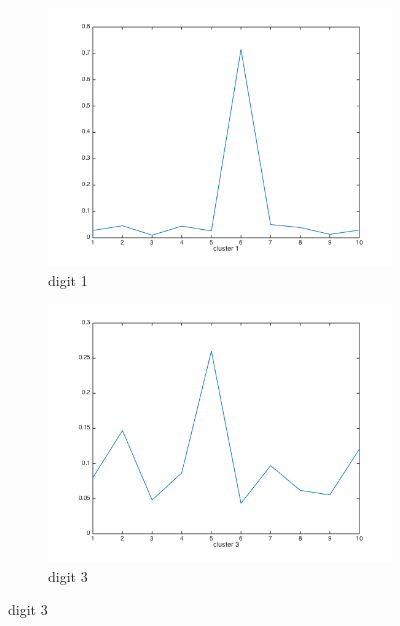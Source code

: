\documentclass[]{article}
\begin{document}
\begin{figure}[p]
	\centering
	\begin{subfigure}{.5\textwidth}
		\centering
		\includegraphics[width=1\linewidth]{../images-update/2-(3)-(a)-2.png}
		\caption{digit 1}
		\label{fig:sub1}
	\end{subfigure}
	
	\begin{subfigure}{.5\textwidth}
		\centering
		\includegraphics[width=1\linewidth]{../images-update/2-(3)-a-1.png}
		\caption{digit 3}
		\label{fig:sub1}
	\end{subfigure}
	
\end{figure}
\end{document}
